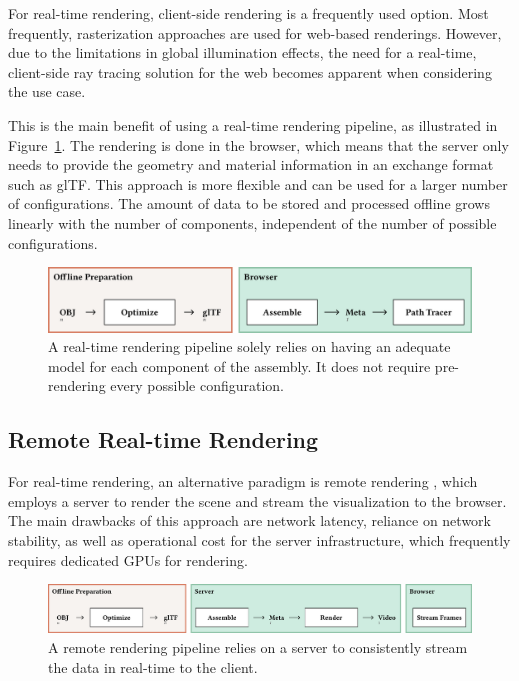 For real-time rendering, client-side rendering is a frequently  used option. Most frequently, rasterization approaches are used for web-based renderings. However, due to the limitations in global illumination effects, the need for a real-time, client-side ray tracing solution for the web becomes apparent when considering the use case.

This is the main benefit of using a real-time rendering pipeline, as illustrated in Figure~\ref{fig:cad-online}. The rendering is done in the browser, which means that the server only needs to provide the geometry and material information in an exchange format such as glTF. This approach is more flexible and can be used for a larger number of configurations. The amount of data to be stored and processed offline grows linearly with the number of components, independent of the number of possible configurations.

\begin{figure}[H]
  \includegraphics[width=\columnwidth]{resources/cad-pipeline-online.png}
  \caption{A real-time rendering pipeline solely relies on having an adequate model for each component of the assembly. It does not require pre-rendering every possible configuration.}
  \label{fig:cad-online}
\end{figure}

\subsection*{Remote Real-time Rendering}

For real-time rendering, an alternative paradigm is remote rendering \cite{remoteRendering}, which employs a server to render the scene and stream the visualization to the browser. The main drawbacks of this approach are network latency, reliance on network stability, as well as operational cost for the server infrastructure, which frequently requires dedicated \glspl{GPU} for rendering.

\begin{figure}[H]
  \includegraphics[width=\columnwidth]{resources/cad-pipeline-remote.png}
  \caption{A remote rendering pipeline relies on a server to consistently stream the data in real-time to the client.}
  \label{fig:cad-remote}
\end{figure}

